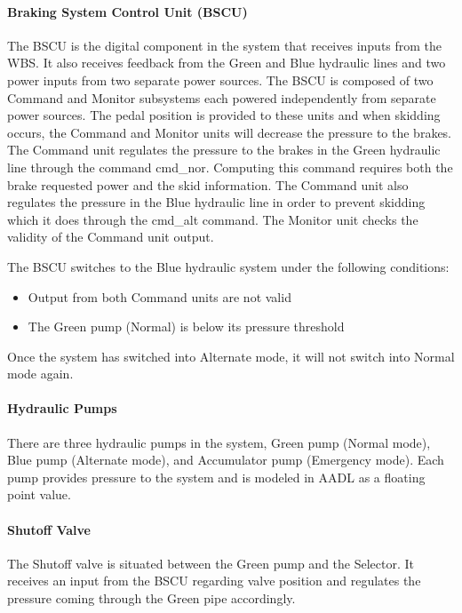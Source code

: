\paragraph{Braking System Control Unit (BSCU)}
The BSCU is the digital component in the system that receives inputs from the WBS. It also receives feedback from the Green and Blue hydraulic lines and two power inputs from two separate power sources. The BSCU is composed of two Command and Monitor subsystems each powered independently from separate power sources. The pedal position is provided to these units and when skidding occurs, the Command and Monitor units will decrease the pressure to the brakes.
The Command unit regulates the pressure to the brakes in the Green hydraulic line through the command cmd\_nor. Computing this command requires both the brake requested power and the skid information. The Command unit also regulates the pressure in the Blue hydraulic line in order to prevent skidding which it does through the cmd\_alt command. The Monitor unit checks the validity of the Command unit output.

The BSCU switches to the Blue hydraulic system under the following conditions:
\begin{itemize}
\item Output from both Command units are not valid
\item The Green pump (Normal) is below its pressure threshold
\end{itemize}

\noindent Once the system has switched into Alternate mode, it will not switch into Normal mode again.

\paragraph{Hydraulic Pumps}
There are three hydraulic pumps in the system, Green pump (Normal mode), Blue pump (Alternate mode), and Accumulator pump (Emergency mode). Each pump provides pressure to the system and is modeled in AADL as a floating point value.

\paragraph{Shutoff Valve}

The Shutoff valve is situated between the Green pump and the Selector. It receives an input from the BSCU regarding valve position and regulates the pressure coming through the Green pipe accordingly.


